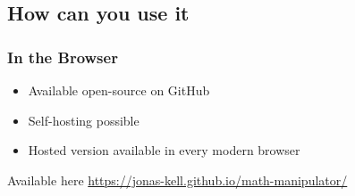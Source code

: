     \subsection{How can you use it}
        \begin{frame}
            \frametitle{In the Browser}

            \begin{itemize}
                \item Available open-source on GitHub
                \item Self-hosting possible
                \item Hosted version available in every modern browser
            \end{itemize}

            \vspace{1em}

            \pause
            \begin{block}{Available here}
                \href{https://jonas-kell.github.io/math-manipulator/}{https://jonas-kell.github.io/math-manipulator/}
            \end{block}

            \onslide %
        \end{frame}
    
